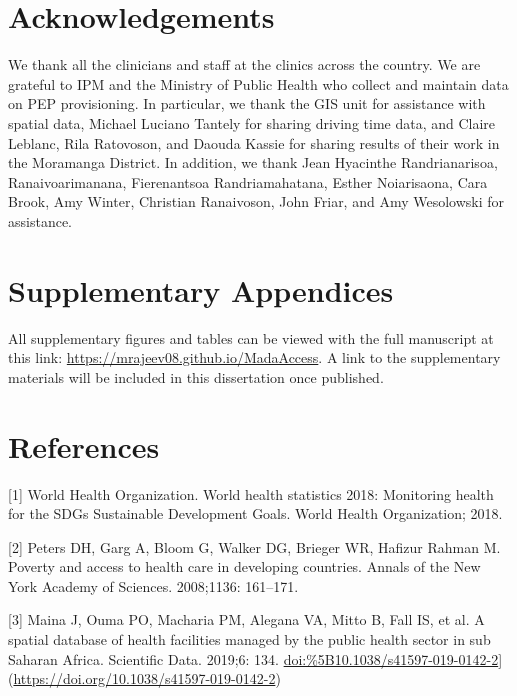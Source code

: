 \documentclass[
  oneside]{book}
\begin{document}
\hypertarget{acknowledgements-1}{%
\section{Acknowledgements}\label{acknowledgements-1}}

We thank all the clinicians and staff at the clinics across the country.
We are grateful to IPM and the Ministry of Public Health who collect and
maintain data on PEP provisioning. In particular, we thank the GIS unit
for assistance with spatial data, Michael Luciano Tantely for sharing
driving time data, and Claire Leblanc, Rila Ratovoson, and Daouda Kassie
for sharing results of their work in the Moramanga District. In
addition, we thank Jean Hyacinthe Randrianarisoa, Ranaivoarimanana,
Fierenantsoa Randriamahatana, Esther Noiarisaona, Cara Brook, Amy
Winter, Christian Ranaivoson, John Friar, and Amy Wesolowski for
assistance.

\hypertarget{supplementary-appendices}{%
\section{Supplementary Appendices}\label{supplementary-appendices}}

All supplementary figures and tables can be viewed with the full manuscript at this link:
\url{https://mrajeev08.github.io/MadaAccess}. A link to the supplementary materials will be included in this dissertation once published.

\hypertarget{references-2}{%
\section{References}\label{references-2}}

\setlength{\parskip}{1em}

{[}1{]} World Health Organization. World health statistics 2018: Monitoring
health for the SDGs Sustainable Development Goals. World Health
Organization; 2018.

{[}2{]} Peters DH, Garg A, Bloom G, Walker DG, Brieger WR, Hafizur Rahman M.
Poverty and access to health care in developing countries. Annals of the
New York Academy of Sciences. 2008;1136: 161--171.

{[}3{]} Maina J, Ouma PO, Macharia PM, Alegana VA, Mitto B, Fall IS, et al.
A spatial database of health facilities managed by the public health
sector in sub Saharan Africa. Scientific Data. 2019;6: 134.
\url{doi:\%5B10.1038/s41597-019-0142-2}{]}(\url{https://doi.org/10.1038/s41597-019-0142-2})
\end{document}
